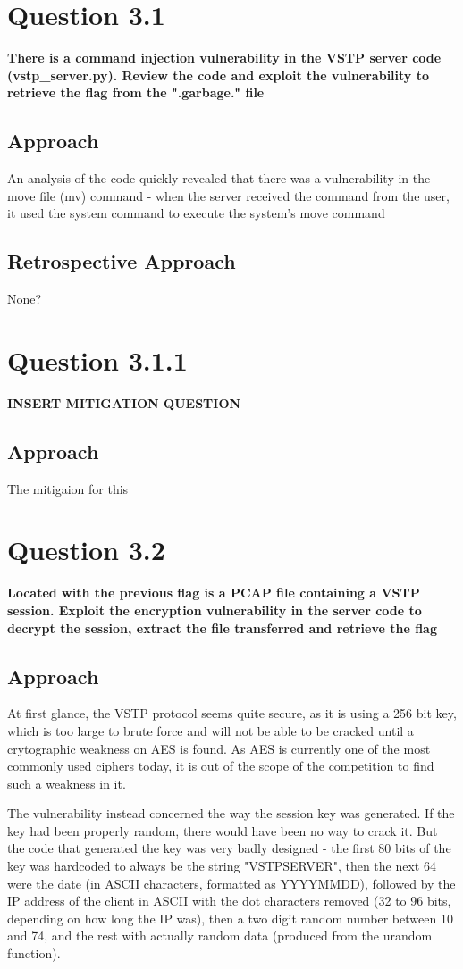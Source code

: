 \section{Question 3.1}
\textbf{There is a command injection vulnerability in the VSTP server code
(vstp\_server.py). Review the code and exploit the vulnerability to retrieve the
flag from the ".garbage." file}
\subsection{Approach}
An analysis of the code quickly revealed that there was a vulnerability in the
move file (mv) command - when the server received the command from the user,
it used the system command to execute the system's move command 

\subsection{Retrospective Approach}
None?

\section{Question 3.1.1}
\textbf{INSERT MITIGATION QUESTION}
\subsection{Approach}
The mitigaion for this 

\section{Question 3.2}
\textbf{Located with the previous flag is a PCAP file containing a VSTP session.
Exploit the encryption vulnerability in the server code to decrypt the session,
extract the file transferred and retrieve the flag}
\subsection{Approach}
At first glance, the VSTP protocol seems quite secure, as it is using a 256
bit key, which is too large to brute force and will not be able to be cracked
until a crytographic weakness on AES is found. As AES is currently one of the
most commonly used ciphers today, it is out of the scope of the competition to
find such a weakness in it.

The vulnerability instead concerned the way the session key was generated. If
the key had been properly random, there would have been no way to crack it. But
the code that generated the key was very badly designed - the first 80 bits of
the key was hardcoded to always be the string "VSTPSERVER", then the next 64
were the date (in ASCII characters, formatted as YYYYMMDD), followed by the IP
address of the client in ASCII with the dot characters removed (32 to 96 bits,
depending on how long the IP was), then a two digit random number between 10
and 74, and the rest with actually random data (produced from the urandom 
function).

